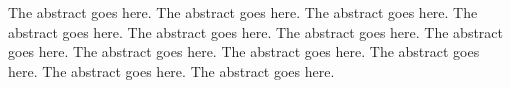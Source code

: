 The abstract goes here.
The abstract goes here.
The abstract goes here.
The abstract goes here.
The abstract goes here.
The abstract goes here.
The abstract goes here.
The abstract goes here.
The abstract goes here.
The abstract goes here.
The abstract goes here.
The abstract goes here.
